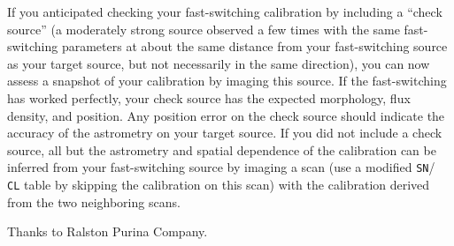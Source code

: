 If you anticipated checking your fast-switching calibration by
including a ``check source'' (a moderately strong source observed a
few times with the same fast-switching parameters at about the same
distance from your fast-switching source as your target source, but
not necessarily in the same direction), you can now assess a snapshot
of your calibration by imaging this source. If the fast-switching has
worked perfectly, your check source has the expected morphology,
flux density, and position.  Any position error on the check source
should indicate the accuracy of the astrometry on your target source.
If you did not include a check source, all but the astrometry and
spatial dependence of the calibration can be inferred from your
fast-switching source by imaging a scan (use a modified {\tt SN}/{\tt
CL} table by skipping the calibration on this scan) with the
calibration derived from the two neighboring
scans.



\bre
{}
\item[ ]{\hfill Thanks to Ralston Purina Company.}
\ere
\vfill\eject


